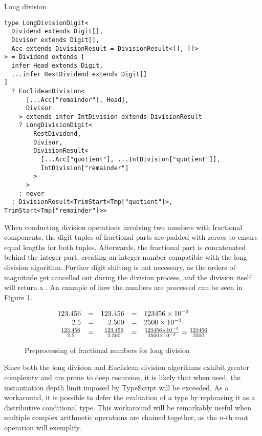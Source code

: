 \begin{listing}[ht]
\caption{Long division}\label{lst:long-division}
\begin{verbatim}
type LongDivisionDigit<
  Dividend extends Digit[],
  Divisor extends Digit[],
  Acc extends DivisionResult = DivisionResult<[], []>
> = Dividend extends [
  infer Head extends Digit,
  ...infer RestDividend extends Digit[]
]
  ? EuclideanDivision<
      [...Acc["remainder"], Head],
      Divisor
    > extends infer IntDivision extends DivisionResult
    ? LongDivisionDigit<
        RestDividend,
        Divisor,
        DivisionResult<
          [...Acc["quotient"], ...IntDivision["quotient"]],
          IntDivision["remainder"]
        >
      >
    : never
  : DivisionResult<TrimStart<Tmp["quotient"]>, TrimStart<Tmp["remainder"]>>
\end{verbatim}
\end{listing}

When conducting division operations involving two numbers with fractional components, the digit tuples of fractional parts are padded with zeroes to ensure equal lengths for both tuples. Afterwards, the fractional part is concatenated behind the integer part, creating an integer number compatible with the long division algorithm. Further digit shifting is not necessary, as the orders of magnitude get cancelled out during the division process, and the division itself will return a . An example of how the numbers are processed can be seen in Figure \ref{fig:long-division-preprocessing}.

\begin{figure}
  \begin{equation*}
    \begin{array}{r@{\quad=\quad}r@{\quad=\quad}l}
      123.456 & 123.456 & 123456 \times 10^{-3} \\
      2.5 & 2.500 & 2500 \times 10^{-3} \\
      \frac{123.456}{2.5} & \frac{123.456}{2.500} & \frac{123456 \times 10^{-3}}{2500 \times 10^{-3}} = \frac{123456}{2500} 
    \end{array}
  \end{equation*}
  \caption{Preprocessing of fractional numbers for long division}\label{fig:long-division-preprocessing}
\end{figure}


Since both the long division and Euclidean division algorithms exhibit greater complexity and are prone to deep recursion, it is likely that when used, the instantiation depth limit imposed by TypeScript will be exceeded. As a workaround, it is possible to defer the evaluation of a type by rephrasing it as a distributive conditional type. This workaround will be remarkably useful when multiple complex arithmetic operations are chained together, as the $n$-th root operation will exemplify.